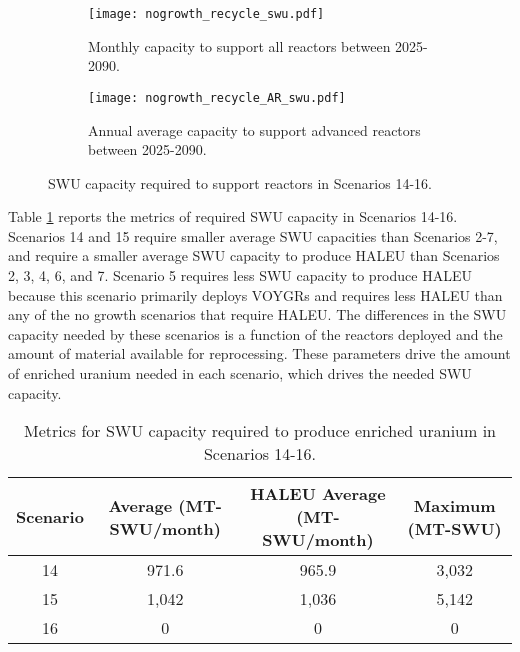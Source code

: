 \begin{figure}[h!]
    \centering
    \begin{subfigure}[b]{0.45\textwidth}
        \centering
        \texttt{[image: nogrowth\_recycle\_swu.pdf]}
        \caption{Monthly capacity to support all reactors between 2025-2090.}
        \label{fig:nogrowth_recycle_swu_all}
    \end{subfigure}
    \hfill
    \begin{subfigure}[b]{0.45\textwidth}
        \centering
        \texttt{[image: nogrowth\_recycle\_AR\_swu.pdf]}
        \caption{Annual average capacity to support advanced reactors between 2025-2090.}
        \label{fig:nogrowth_recycle_swu_AR}
    \end{subfigure}
       \caption{\gls{SWU} capacity required to support 
       reactors in Scenarios 14-16.}
       \label{fig:nogrowth_recycle_swu}
\end{figure}

Table \ref{tab:s14-16_swu} reports the metrics of required \gls{SWU} 
capacity in Scenarios 14-16. Scenarios 14 and 15 require smaller 
average \gls{SWU} capacities than Scenarios 2-7, and require a 
smaller average \gls{SWU} capacity to produce \gls{HALEU} than 
Scenarios 2, 3, 4, 6, and 7. Scenario 5 requires less \gls{SWU} 
capacity to produce \gls{HALEU} because this scenario 
primarily deploys VOYGRs and requires less \gls{HALEU} than 
any of the no growth scenarios that require \gls{HALEU}. 
The differences in the 
\gls{SWU} capacity needed by these scenarios is a function of 
the reactors deployed and the amount of material available for 
reprocessing. These parameters drive the amount of enriched 
uranium needed in each scenario, which drives the needed 
\gls{SWU} capacity.

\begin{table}[h!]
    \centering 
    \caption{Metrics for \gls{SWU} capacity required to produce 
    enriched uranium in Scenarios 14-16.}
    \label{tab:s14-16_swu}
    \begin{tabular}{c c c c}
        \hline 
        Scenario & Average (MT-SWU/month) & HALEU Average (MT-SWU/month)
         & Maximum (MT-SWU) \\
        \hline 
        14 & 971.6 & 965.9 & 3,032 \\
        15 & 1,042 & 1,036 & 5,142 \\
        16 & 0 & 0 & 0 \\
        \hline
        
    \end{tabular}
\end{table}


